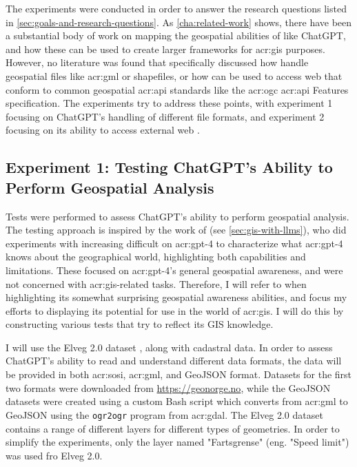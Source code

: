 The experiments were conducted in order to answer the research questions listed in \autoref{sec:goals-and-research-questions}. As \autoref{cha:related-work} shows, there have been a substantial body of work on mapping the geospatial abilities of  like ChatGPT, and how these can be used to create larger frameworks for \acrshort{acr:gis} purposes. However, no literature was found that specifically discussed how  handle geospatial files like \acrshort{acr:gml} or shapefiles, or how  can be used to access web  that conform to common geospatial \acrshort{acr:api} standards like the \acrshort{acr:ogc} \acrshort{acr:api} Features specification. The experiments try to address these points, with experiment 1 focusing on ChatGPT's handling of different file formats, and experiment 2 focusing on its ability to access external web .

\subsection{Experiment 1: Testing ChatGPT's Ability to Perform Geospatial Analysis}

Tests were performed to assess ChatGPT's ability to perform geospatial analysis. The testing approach is inspired by the work of \cite{robertsGPT4GEOHowLanguage2023} (see \autoref{sec:gis-with-llms}), who did experiments with increasing difficult on \acrshort{acr:gpt}-4 to characterize what \acrshort{acr:gpt}-4 knows about the geographical world, highlighting both capabilities and limitations. These focused on \acrshort{acr:gpt}-4's general geospatial awareness, and were not concerned with \acrshort{acr:gis}-related tasks. Therefore, I will refer to \cite{robertsGPT4GEOHowLanguage2023} when highlighting its somewhat surprising geospatial awareness abilities, and focus my efforts to displaying its potential for use in the world of \acrshort{acr:gis}. I will do this by constructing various tests that try to reflect its GIS knowledge.

I will use the Elveg 2.0 dataset \citep{thenorwegianmappingauthorityElveg2019}, along with cadastral data. In order to assess ChatGPT's ability to read and understand different data formats, the data will be provided in both \acrshort{acr:sosi}, \acrshort{acr:gml}, and GeoJSON format. Datasets for the first two formats were downloaded from \url{https://geonorge.no}, while the GeoJSON datasets were created using a custom Bash script which converts from \acrshort{acr:gml} to GeoJSON using the \texttt{ogr2ogr} program from \acrshort{acr:gdal}. The Elveg 2.0 dataset contains a range of different layers for different types of geometries. In order to simplify the experiments, only the layer named "Fartsgrense" (eng. "Speed limit") was used fro Elveg 2.0.

